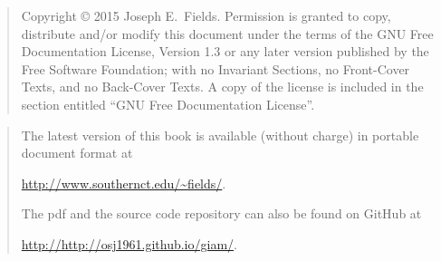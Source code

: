 \rule{0pt}{0pt}

\vfill

\begin{quote}
    Copyright \copyright{}  2015  Joseph E.\ Fields.
    Permission is granted to copy, distribute and/or modify this document
    under the terms of the GNU Free Documentation License, Version 1.3
    or any later version published by the Free Software Foundation;
    with no Invariant Sections, no Front-Cover Texts, and no Back-Cover Texts.
    A copy of the license is included in the section entitled ``GNU
    Free Documentation License''.
\end{quote}

\vfill

\begin{quote}
The latest version of this book is available (without charge) in portable document format at \newline
\rule{0pt}{0pt} \hspace{1in} \url{http://www.southernct.edu/~fields/}.  

\noindent The pdf and the source code repository can also be found on GitHub at \newline
\rule{0pt}{0pt} \hspace{1in} \url{http://http://osj1961.github.io/giam/}.  


\end{quote}

\vfill
